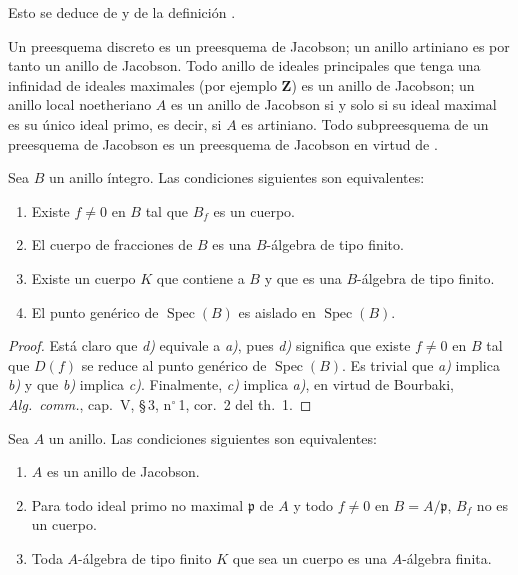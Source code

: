 Esto se deduce de  y de la definición .

\begin{env}[10.4.3]
\label{IV.10.4.3}
Un preesquema discreto es un preesquema de Jacobson; un anillo artiniano es por tanto un anillo de Jacobson.
Todo anillo de ideales principales que tenga una infinidad de ideales maximales (por ejemplo $\mathbf Z$) es un anillo de Jacobson; un anillo local noetheriano $A$ es un anillo de Jacobson si y solo si su ideal maximal es su único ideal primo, es decir, si $A$ es artiniano.
Todo subpreesquema de un preesquema de Jacobson es un preesquema de Jacobson en virtud de .
\end{env}

\begin{proposition}[10.4.4]
\label{IV.10.4.4}
Sea $B$ un anillo íntegro.
Las condiciones siguientes son equivalentes:
\begin{enumerate}[label=\emph{\alph*)}]
  \item Existe $f\neq0$ en $B$ tal que $B_f$ es un cuerpo.
  \item El cuerpo de fracciones de $B$ es una $B$-álgebra de tipo finito.
  \item Existe un cuerpo $K$ que contiene a $B$ y que es una $B$-álgebra de tipo finito.
  \item El punto genérico de $\operatorname{Spec}(B)$ es aislado en $\operatorname{Spec}(B)$.
\end{enumerate}
\end{proposition}

\begin{proof}
Está claro que \emph{d)} equivale a \emph{a)}, pues \emph{d)} significa que existe $f\neq0$ en $B$ tal que $D(f)$ se reduce al punto genérico de $\operatorname{Spec}(B)$.
Es trivial que \emph{a)} implica \emph{b)} y que \emph{b)} implica \emph{c)}.
Finalmente, \emph{c)} implica \emph{a)}, en virtud de Bourbaki, \emph{Alg.\ comm.}, cap.~V, \S\,3, n$^\circ$\,1, cor.~2 del th.~1.
\end{proof}

\begin{proposition}[10.4.5]
\label{IV.10.4.5}
Sea $A$ un anillo.
Las condiciones siguientes son equivalentes:
\begin{enumerate}[label=\emph{\alph*)}]
  \item $A$ es un anillo de Jacobson.
  \item Para todo ideal primo no maximal $\mathfrak p$ de $A$ y todo $f\neq0$ en $B=A/\mathfrak p$, $B_f$ no es un cuerpo.
  \item[\rm b$'$)] Toda $A$-álgebra de tipo finito $K$ que sea un cuerpo es una $A$-álgebra finita.
\end{enumerate}
\end{proposition}

